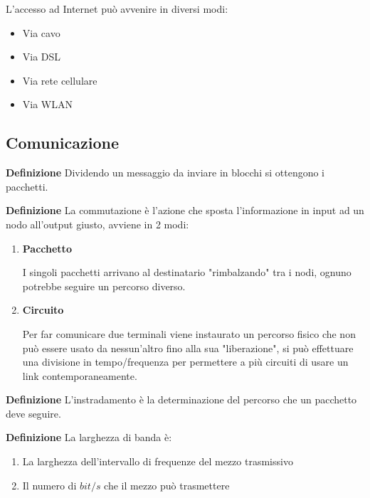 \documentclass{article}
\begin{document}
\noindent L'accesso ad Internet può avvenire in diversi modi:
\begin{itemize}
    \item Via cavo
    \item Via DSL
    \item Via rete cellulare
    \item Via WLAN\newline
\end{itemize}

\subsection{Comunicazione}

\textbf{Definizione} Dividendo un messaggio da inviare in blocchi si ottengono i pacchetti.\newline

\noindent\textbf{Definizione} La commutazione è l'azione che sposta l'informazione in input ad un nodo all'output giusto, avviene in 2 modi:
\begin{enumerate}
    \item \textbf{Pacchetto}

        I singoli pacchetti arrivano al destinatario "rimbalzando" tra i nodi, ognuno potrebbe seguire un percorso diverso.
    
    \item \textbf{Circuito}

        Per far comunicare due terminali viene instaurato un percorso fisico che non può essere usato da nessun'altro fino alla sua "liberazione", si può effettuare una divisione in tempo/frequenza per permettere a più circuiti di usare un link contemporaneamente.\newline
    
\end{enumerate}

\noindent\textbf{Definizione} L'instradamento è la determinazione del percorso che un pacchetto deve seguire.\newline

\noindent\textbf{Definizione} La larghezza di banda è:
\begin{enumerate}
    \item La larghezza dell'intervallo di frequenze del mezzo trasmissivo
    \item Il numero di $bit/s$ che il mezzo può trasmettere\newline
\end{enumerate}
\end{document}
